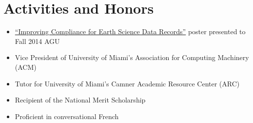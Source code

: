 \documentclass[letterpaper,12pt]{article}
\begin{document}
\vskip 3.5mm

\section*{Activities and Honors}
\begin{itemize}
  \item \href{https://oychang.com/research/jpl/compliance-checker-poster.pdf}{``Improving Compliance for Earth Science Data Records''} poster presented to Fall 2014 AGU
  \item Vice President of University of Miami's Association for Computing Machinery (ACM)
  \item Tutor for University of Miami's Camner Academic Resource Center (ARC)
  \item Recipient of the National Merit Scholarship
  \item Proficient in conversational French
\end{itemize}
\end{document}
